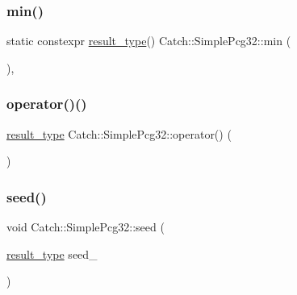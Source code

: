 \mbox{\label{class_catch_1_1_simple_pcg32_a388575137fa70bb32a367a5ad59f2a46}} 
\subsubsection{\texorpdfstring{min()}{min()}}
{\footnotesize\ttfamily static constexpr \mbox{\hyperlink{class_catch_1_1_simple_pcg32_a220ca38f6d16804c6e99937a673ec3ff}{result\+\_\+type}}() Catch\+::\+Simple\+Pcg32\+::min (\begin{DoxyParamCaption}{ }\end{DoxyParamCaption})\hspace{0.3cm}{\ttfamily [inline]}, {\ttfamily [static]}}

\mbox{\label{class_catch_1_1_simple_pcg32_acda21743a5ac46fdff9a0b4a6d45a91f}} 
\subsubsection{\texorpdfstring{operator()()}{operator()()}}
{\footnotesize\ttfamily \mbox{\hyperlink{class_catch_1_1_simple_pcg32_a220ca38f6d16804c6e99937a673ec3ff}{result\+\_\+type}} Catch\+::\+Simple\+Pcg32\+::operator() (\begin{DoxyParamCaption}{ }\end{DoxyParamCaption})}

\mbox{\label{class_catch_1_1_simple_pcg32_a215dac93c384973353a2b4f87f68c8bc}} 
\subsubsection{\texorpdfstring{seed()}{seed()}}
{\footnotesize\ttfamily void Catch\+::\+Simple\+Pcg32\+::seed (\begin{DoxyParamCaption}\item[{\mbox{\hyperlink{class_catch_1_1_simple_pcg32_a220ca38f6d16804c6e99937a673ec3ff}{result\+\_\+type}}}]{seed\+\_\+ }\end{DoxyParamCaption})}




